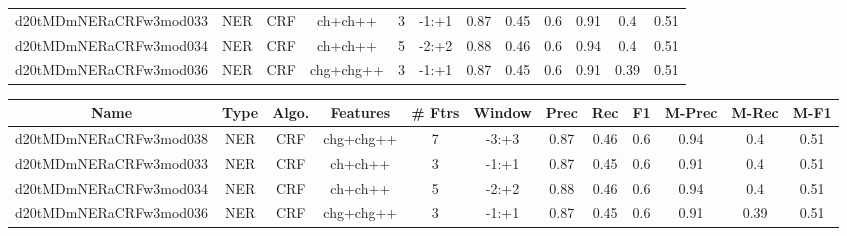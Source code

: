 \documentclass[a4paper]{article}
\begin{document}
\begin{landscape}
\begin{center}
\begin{tabular}{ |c|c|c|c|c|c|c|c|c|c|c|c|}
 	
 
 	
 		
 		\small{ d20tMDmNERaCRFw3mod033 } & NER & CRF & ch+ch++  &  3 &  -1:+1  &  0.87 & 0.45 & 0.6  &  0.91 & 0.4 & 0.51 \\
 		

 	
 
 	
 		
 		\small{ d20tMDmNERaCRFw3mod034 } & NER & CRF & ch+ch++  &  5 &  -2:+2  &  0.88 & 0.46 & 0.6  &  0.94 & 0.4 & 0.51 \\
 		

 	
 
 	
 		
 		\small{ d20tMDmNERaCRFw3mod036 } & NER & CRF & chg+chg++  &  3 &  -1:+1  &  0.87 & 0.45 & 0.6  &  0.91 & 0.39 & 0.51 \\
 		
 \hline
\end{tabular}
\end{center}




\begin{center}
\begin{tabular}{ |c|c|c|c|c|c|c|c|c|c|c|c|} 
 \hline
 	Name & Type & Algo. & Features & \# Ftrs & Window & Prec & Rec & F1 & M-Prec & M-Rec & M-F1\\
 \hline

 		

 	
 
 	
 		
 		\small{ d20tMDmNERaCRFw3mod038 } & NER & CRF & chg+chg++  &  7 &  -3:+3  &  0.87 & 0.46 & 0.6  &  0.94 & 0.4 & 0.51 \\
 		

 	
 
 	
 		
 		\small{ d20tMDmNERaCRFw3mod033 } & NER & CRF & ch+ch++  &  3 &  -1:+1  &  0.87 & 0.45 & 0.6  &  0.91 & 0.4 & 0.51 \\
 		

 	
 
 	
 		
 		\small{ d20tMDmNERaCRFw3mod034 } & NER & CRF & ch+ch++  &  5 &  -2:+2  &  0.88 & 0.46 & 0.6  &  0.94 & 0.4 & 0.51 \\
 		

 	
 
 	
 		
 		\small{ d20tMDmNERaCRFw3mod036 } & NER & CRF & chg+chg++  &  3 &  -1:+1  &  0.87 & 0.45 & 0.6  &  0.91 & 0.39 & 0.51 \\
 		


\end{tabular}
\end{center}
\end{landscape}
\end{document}
